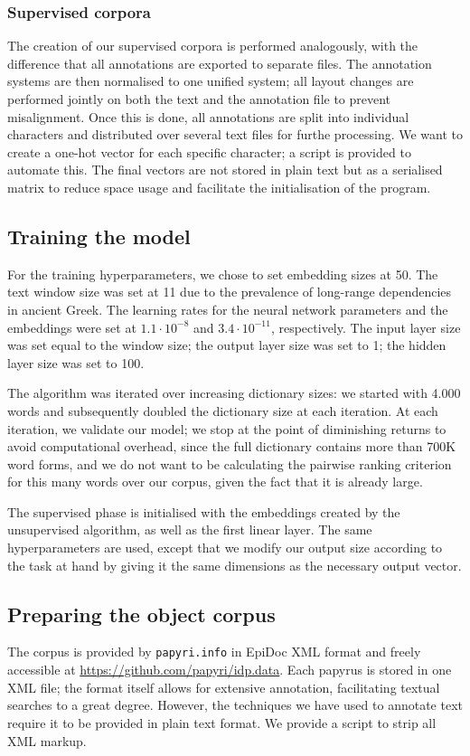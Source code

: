 \subsubsection{Supervised corpora}
\label{sec:supcorp}
The creation of our supervised corpora is performed analogously, with
the difference that all annotations are exported to separate
files. The annotation systems are then normalised to one unified
system; all layout changes are performed jointly on both the text and
the annotation file to prevent misalignment. Once this is done, all
annotations are split into individual characters and distributed over
several text files for furthe processing. We want to create a one-hot
vector for each specific character; a script is provided to automate
this. The final vectors are not stored in plain text but as a
serialised matrix to reduce space usage and facilitate the
initialisation of the program.

\subsection{Training the model}
\label{sec:createmodel}

For the training hyperparameters, we chose to set embedding sizes at
50. The text window size was set at 11 due to the prevalence of
long-range dependencies in ancient Greek. The learning rates for the
neural network parameters and the embeddings were set at $1.1 \cdot
10^{-8}$ and $3.4 \cdot 10^{-11}$, respectively. The input layer size
was set equal to the window size; the output layer size was set to 1;
the hidden layer size was set to 100.

The algorithm was iterated over increasing dictionary sizes: we
started with 4.000 words and subsequently doubled the dictionary size
at each iteration. At each iteration, we validate our model; we stop
at the point of diminishing returns to avoid computational overhead,
since the full dictionary contains more than 700K word forms, and we
do not want to be calculating the pairwise ranking criterion for this
many words over our corpus, given the fact that it is already large.

The supervised phase is initialised with the embeddings created by the
unsupervised algorithm, as well as the first linear layer. The same
hyperparameters are used, except that we modify our output size
according to the task at hand by giving it the same dimensions as the
necessary output vector.

\subsection{Preparing the object corpus}
\label{sec:createmodel}
The corpus is provided by \texttt{papyri.info} in EpiDoc XML format
and freely accessible at
\url{https://github.com/papyri/idp.data}. Each papyrus is stored in
one XML file; the format itself allows for extensive annotation,
facilitating textual searches to a great degree. However, the
techniques we have used to annotate text require it to be provided in
plain text format. We provide a script to strip all XML markup.

